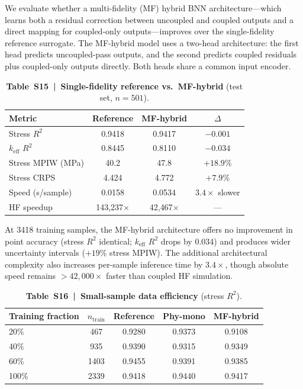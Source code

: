 \documentclass[11pt,a4paper]{article}
\newcommand{\keff}{\ensuremath{k_{\mathrm{eff}}}}
\begin{document}
We evaluate whether a multi-fidelity (MF) hybrid BNN architecture---which
learns both a residual correction between uncoupled and coupled outputs
and a direct mapping for coupled-only outputs---improves over the
single-fidelity reference surrogate. The MF-hybrid model uses a two-head
architecture: the first head predicts uncoupled-pass outputs, and the
second predicts coupled residuals plus coupled-only outputs directly.
Both heads share a common input encoder.

\begin{table}[htbp]
\centering
\caption{\textbf{Table~S15~|~Single-fidelity reference vs.\ MF-hybrid}
(test set, $n = 501$).}
\label{tab:S15}
\smallskip
\small
\begin{tabular}{lccc}
\toprule
Metric & Reference & MF-hybrid & $\Delta$ \\
\midrule
Stress $R^2$           & 0.9418  & 0.9417  & $-0.001$ \\
\keff{} $R^2$          & 0.8445  & 0.8110  & $-0.034$ \\
Stress MPIW (MPa)      & 40.2    & 47.8    & $+18.9$\% \\
Stress CRPS            & 4.424   & 4.772   & $+7.9$\% \\
Speed (s/sample)       & 0.0158  & 0.0534  & $3.4\times$ slower \\
HF speedup             & 143{,}237$\times$ & 42{,}467$\times$ & --- \\
\bottomrule
\end{tabular}
\end{table}

At 3418 training samples, the MF-hybrid architecture offers no
improvement in point accuracy (stress $R^2$ identical; \keff{} $R^2$
drops by 0.034) and produces wider uncertainty intervals ($+19$\%
stress MPIW). The additional architectural complexity also increases
per-sample inference time by $3.4\times$, though absolute speed remains
${>}42{,}000\times$ faster than coupled HF simulation.

\begin{table}[htbp]
\centering
\caption{\textbf{Table~S16~|~Small-sample data efficiency} (stress $R^2$).}
\label{tab:S16}
\smallskip
\small
\begin{tabular}{lcccc}
\toprule
Training fraction & $n_{\mathrm{train}}$ & Reference & Phy-mono & MF-hybrid \\
\midrule
20\% & 467  & 0.9280 & 0.9373 & 0.9108 \\
40\% & 935  & 0.9390 & 0.9315 & 0.9349 \\
60\% & 1403 & 0.9455 & 0.9391 & 0.9385 \\
100\% & 2339 & 0.9418 & 0.9440 & 0.9417 \\
\bottomrule
\end{tabular}
\end{table}
\end{document}
